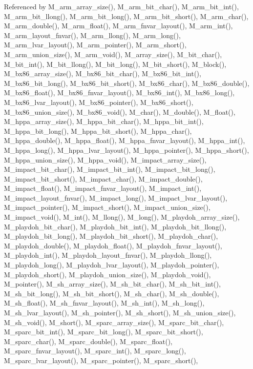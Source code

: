 Referenced by M\_\-arm\_\-array\_\-size(), M\_\-arm\_\-bit\_\-char(), M\_\-arm\_\-bit\_\-int(), M\_\-arm\_\-bit\_\-llong(), M\_\-arm\_\-bit\_\-long(), M\_\-arm\_\-bit\_\-short(), M\_\-arm\_\-char(), M\_\-arm\_\-double(), M\_\-arm\_\-float(), M\_\-arm\_\-fnvar\_\-layout(), M\_\-arm\_\-int(), M\_\-arm\_\-layout\_\-fnvar(), M\_\-arm\_\-llong(), M\_\-arm\_\-long(), M\_\-arm\_\-lvar\_\-layout(), M\_\-arm\_\-pointer(), M\_\-arm\_\-short(), M\_\-arm\_\-union\_\-size(), M\_\-arm\_\-void(), M\_\-array\_\-size(), M\_\-bit\_\-char(), M\_\-bit\_\-int(), M\_\-bit\_\-llong(), M\_\-bit\_\-long(), M\_\-bit\_\-short(), M\_\-block(), M\_\-bx86\_\-array\_\-size(), M\_\-bx86\_\-bit\_\-char(), M\_\-bx86\_\-bit\_\-int(), M\_\-bx86\_\-bit\_\-long(), M\_\-bx86\_\-bit\_\-short(), M\_\-bx86\_\-char(), M\_\-bx86\_\-double(), M\_\-bx86\_\-float(), M\_\-bx86\_\-fnvar\_\-layout(), M\_\-bx86\_\-int(), M\_\-bx86\_\-long(), M\_\-bx86\_\-lvar\_\-layout(), M\_\-bx86\_\-pointer(), M\_\-bx86\_\-short(), M\_\-bx86\_\-union\_\-size(), M\_\-bx86\_\-void(), M\_\-char(), M\_\-double(), M\_\-float(), M\_\-hppa\_\-array\_\-size(), M\_\-hppa\_\-bit\_\-char(), M\_\-hppa\_\-bit\_\-int(), M\_\-hppa\_\-bit\_\-long(), M\_\-hppa\_\-bit\_\-short(), M\_\-hppa\_\-char(), M\_\-hppa\_\-double(), M\_\-hppa\_\-float(), M\_\-hppa\_\-fnvar\_\-layout(), M\_\-hppa\_\-int(), M\_\-hppa\_\-long(), M\_\-hppa\_\-lvar\_\-layout(), M\_\-hppa\_\-pointer(), M\_\-hppa\_\-short(), M\_\-hppa\_\-union\_\-size(), M\_\-hppa\_\-void(), M\_\-impact\_\-array\_\-size(), M\_\-impact\_\-bit\_\-char(), M\_\-impact\_\-bit\_\-int(), M\_\-impact\_\-bit\_\-long(), M\_\-impact\_\-bit\_\-short(), M\_\-impact\_\-char(), M\_\-impact\_\-double(), M\_\-impact\_\-float(), M\_\-impact\_\-fnvar\_\-layout(), M\_\-impact\_\-int(), M\_\-impact\_\-layout\_\-fnvar(), M\_\-impact\_\-long(), M\_\-impact\_\-lvar\_\-layout(), M\_\-impact\_\-pointer(), M\_\-impact\_\-short(), M\_\-impact\_\-union\_\-size(), M\_\-impact\_\-void(), M\_\-int(), M\_\-llong(), M\_\-long(), M\_\-playdoh\_\-array\_\-size(), M\_\-playdoh\_\-bit\_\-char(), M\_\-playdoh\_\-bit\_\-int(), M\_\-playdoh\_\-bit\_\-llong(), M\_\-playdoh\_\-bit\_\-long(), M\_\-playdoh\_\-bit\_\-short(), M\_\-playdoh\_\-char(), M\_\-playdoh\_\-double(), M\_\-playdoh\_\-float(), M\_\-playdoh\_\-fnvar\_\-layout(), M\_\-playdoh\_\-int(), M\_\-playdoh\_\-layout\_\-fnvar(), M\_\-playdoh\_\-llong(), M\_\-playdoh\_\-long(), M\_\-playdoh\_\-lvar\_\-layout(), M\_\-playdoh\_\-pointer(), M\_\-playdoh\_\-short(), M\_\-playdoh\_\-union\_\-size(), M\_\-playdoh\_\-void(), M\_\-pointer(), M\_\-sh\_\-array\_\-size(), M\_\-sh\_\-bit\_\-char(), M\_\-sh\_\-bit\_\-int(), M\_\-sh\_\-bit\_\-long(), M\_\-sh\_\-bit\_\-short(), M\_\-sh\_\-char(), M\_\-sh\_\-double(), M\_\-sh\_\-float(), M\_\-sh\_\-fnvar\_\-layout(), M\_\-sh\_\-int(), M\_\-sh\_\-long(), M\_\-sh\_\-lvar\_\-layout(), M\_\-sh\_\-pointer(), M\_\-sh\_\-short(), M\_\-sh\_\-union\_\-size(), M\_\-sh\_\-void(), M\_\-short(), M\_\-sparc\_\-array\_\-size(), M\_\-sparc\_\-bit\_\-char(), M\_\-sparc\_\-bit\_\-int(), M\_\-sparc\_\-bit\_\-long(), M\_\-sparc\_\-bit\_\-short(), M\_\-sparc\_\-char(), M\_\-sparc\_\-double(), M\_\-sparc\_\-float(), M\_\-sparc\_\-fnvar\_\-layout(), M\_\-sparc\_\-int(), M\_\-sparc\_\-long(), M\_\-sparc\_\-lvar\_\-layout(), M\_\-sparc\_\-pointer(), M\_\-sparc\_\-short(), 